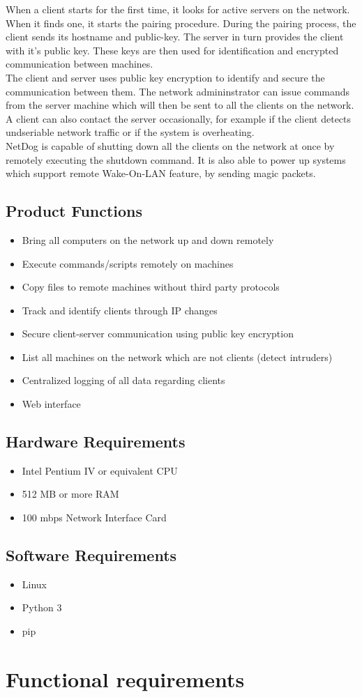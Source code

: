 When a client starts for the first time, it looks for active servers on the
network. When it finds one, it starts the pairing procedure. During the pairing
process, the client sends its hostname and public-key. The server in turn
provides the client with it's public key. These keys are then used for
identification and encrypted communication between machines.\\

The client and server uses public key encryption to identify and secure the
communication between them. The network admininstrator can issue commands from
the server machine which will then be sent to all the clients on the network.
A client can also contact the server occasionally, for example if the client
detects undseriable network traffic or if the system is overheating.\\

NetDog is capable of shutting down all the clients on the network at once by
remotely executing the shutdown command. It is also able to power up systems
which support remote Wake-On-LAN feature, by sending magic packets.\\

\subsection{Product Functions}
\begin{itemize}
    \item Bring all computers on the network up and down remotely
    \item Execute commands/scripts remotely on machines
    \item Copy files to remote machines without third party protocols
    \item Track and identify clients through IP changes
    \item Secure client-server communication using public key encryption
    \item List all machines on the network which are not clients (detect intruders)
    \item Centralized logging of all data regarding clients
    \item Web interface
\end{itemize}

\subsection{Hardware Requirements}
\begin{itemize}
    \item Intel Pentium IV or equivalent CPU
    \item 512 MB or more RAM
    \item 100 mbps Network Interface Card
\end{itemize}

\subsection{Software Requirements}
\begin{itemize}
    \item Linux
    \item Python 3
    \item pip
\end{itemize}

\section{Functional requirements}

